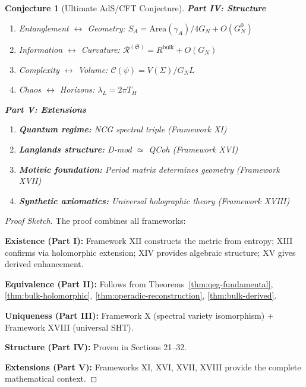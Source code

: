 \documentclass[12pt,a4paper]{article}
\newtheorem{conjecture}[theorem]{Conjecture}
\begin{document}
\begin{conjecture}[Ultimate AdS/CFT Conjecture]
\textbf{Part IV: Structure}
\begin{enumerate}
    \item Entanglement $\leftrightarrow$ Geometry: $S_A = \text{Area}(\gamma_A)/4G_N + O(G_N^0)$
    \item Information $\leftrightarrow$ Curvature: $\mathcal{R}^{(\mathfrak{S})} = R^{\text{bulk}} + O(G_N)$
    \item Complexity $\leftrightarrow$ Volume: $\mathcal{C}(\psi) = V(\Sigma)/G_N L$
    \item Chaos $\leftrightarrow$ Horizons: $\lambda_L = 2\pi T_H$
\end{enumerate}

\textbf{Part V: Extensions}
\begin{enumerate}
    \item \textbf{Quantum regime:} NCG spectral triple (Framework XI)
    \item \textbf{Langlands structure:} D-mod $\simeq$ QCoh (Framework XVI)
    \item \textbf{Motivic foundation:} Period matrix determines geometry (Framework XVII)
    \item \textbf{Synthetic axiomatics:} Universal holographic theory (Framework XVIII)
\end{enumerate}
\end{conjecture}

\begin{proof}[Proof Sketch]
The proof combines all frameworks:

\textbf{Existence (Part I):} Framework XII constructs the metric from entropy; XIII confirms via holomorphic extension; XIV provides algebraic structure; XV gives derived enhancement.

\textbf{Equivalence (Part II):} Follows from Theorems~\ref{thm:qeg-fundamental}, \ref{thm:bulk-holomorphic}, \ref{thm:operadic-reconstruction}, \ref{thm:bulk-derived}.

\textbf{Uniqueness (Part III):} Framework X (spectral variety isomorphism) + Framework XVIII (universal SHT).

\textbf{Structure (Part IV):} Proven in Sections 21--32.

\textbf{Extensions (Part V):} Frameworks XI, XVI, XVII, XVIII provide the complete mathematical context.
\end{proof}
\end{document}
